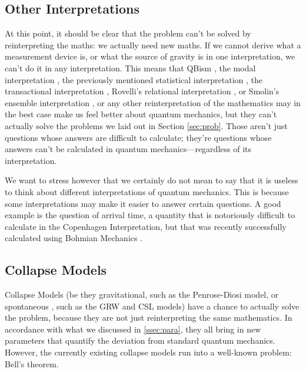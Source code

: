 \documentclass[superscriptaddress,floatfix,nofootinbib,12pt]{revtex4-2}
\begin{document}
\subsection{Other Interpretations} 
At this point, it should be clear that the problem can't be solved by reinterpreting the maths: we actually need new maths. If we cannot derive what a measurement device is, or what the source of gravity is in one interpretation, we can't do it in any interpretation. This means that QBism \cite{Caves2002QBism,fuchs2010qbism,Fuchs2014QBism}, the modal interpretation \cite{dieks1998modal}, the previously mentioned statistical interpretation \cite{ballentine1970statistical}, the transactional interpretation \cite{cramer1986transactional,kastner2013transactional}, Rovelli's relational interpretation \cite{rovelli1996relational,adlam2022information}, or Smolin's ensemble interpretation \cite{smolin2012real}, or any other reinterpretation of the mathematics may in the best case make us feel better about quantum mechanics, but they can't actually solve the problems we laid out in Section \ref{sec:prob}. Those aren't just questions whose answers are difficult to calculate; they're questions whose answers can't be calculated in quantum mechanics---regardless of its interpretation. 

We want to stress however that we certainly do not mean to say that it is useless to think about different interpretations of quantum mechanics. This is because some interpretations may make it easier to answer certain questions. A good example is the question of arrival time, a quantity that is notoriously difficult to calculate in the Copenhagen Interpretation, but that was recently successfully calculated using Bohmian Mechanics \cite{das2019arrival}.  

\subsection{Collapse Models}

Collapse Models (be they gravitational, such as the Penrose-Diosi model, or spontaneous \cite{bassi2003dynamical}, such as the GRW \cite{Ghirardi1986GRW} and CSL \cite{ghirardi1990csl} models) have a chance to actually solve the problem, because they are not just reinterpreting the same mathematics. In accordance with what we discussed in \ref{ssec:para}, they all bring in new parameters that quantify the deviation from standard quantum mechanics. However, the currently existing collapse models run into a well-known problem: Bell's theorem. 
\end{document}
